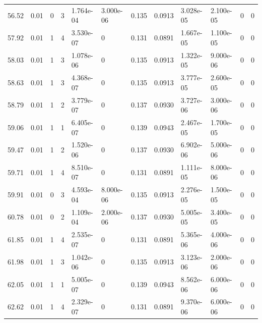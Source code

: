 \documentclass[preview]{standalone}
\begin{document}
{{{\begin{tabular}{L{1.2cm}C{1.2cm} C{0.3cm}C{0.5cm} C{1.4cm}C{1.4cm} C{1.4cm}C{1.4cm} C{1.6cm}C{1.6cm} C{1.6cm}C{1.6cm}}
  56.52  &  0.01  & 0     &  3 &  1.764e-04  & 3.000e-06  &  0.135&   0.0913& 3.028e-05 & 2.100e-05   &  0 & 0  \\ 
  57.92  &  0.01  & 1     &  4 &  3.530e-07  & 0  &  0.131&   0.0891& 1.667e-05 & 1.100e-05   &  0 & 0  \\ 
  58.03  &  0.01  & 1     &  3 &  1.078e-06  & 0  &  0.135&   0.0913& 1.322e-05 & 9.000e-06   &  0 & 0  \\ 
  58.63  &  0.01  & 1     &  3 &  4.368e-07  & 0  &  0.135&   0.0913& 3.777e-05 & 2.600e-05   &  0 & 0  \\ 
  58.79  &  0.01  & 1     &  2 &  3.779e-07  & 0  &  0.137&   0.0930& 3.727e-06 & 3.000e-06   &  0 & 0  \\ 
  59.06  &  0.01  & 1     &  1 &  6.405e-07  & 0  &  0.139&   0.0943& 2.467e-05 & 1.700e-05   &  0 & 0  \\ 
  59.47  &  0.01  & 1     &  2 &  1.520e-06  & 0  &  0.137&   0.0930& 6.902e-06 & 5.000e-06   &  0 & 0  \\ 
  59.71  &  0.01  & 1     &  4 &  8.510e-07  & 0  &  0.131&   0.0891& 1.111e-05 & 8.000e-06   &  0 & 0  \\ 
  59.91  &  0.01  & 0     &  3 &  4.593e-04  & 8.000e-06  &  0.135&   0.0913& 2.276e-05 & 1.500e-05   &  0 & 0  \\ 
  60.78  &  0.01  & 0     &  2 &  1.109e-04  & 2.000e-06  &  0.137&   0.0930& 5.005e-05 & 3.400e-05   &  0 & 0  \\ 
  61.85  &  0.01  & 1     &  4 &  2.535e-07  & 0  &  0.131&   0.0891& 5.365e-06 & 4.000e-06   &  0 & 0  \\ 
  61.98  &  0.01  & 1     &  3 &  1.042e-06  & 0  &  0.135&   0.0913& 3.123e-06 & 2.000e-06   &  0 & 0  \\ 
  62.05  &  0.01  & 1     &  1 &  5.005e-07  & 0  &  0.139&   0.0943& 8.562e-06 & 6.000e-06   &  0 & 0  \\ 
  62.62  &  0.01  & 1     &  4 &  2.329e-07  & 0  &  0.131&   0.0891& 9.370e-06 & 6.000e-06   &  0 & 0  \\ 
\hline 
\end{tabular} 

}}}
\end{document}
